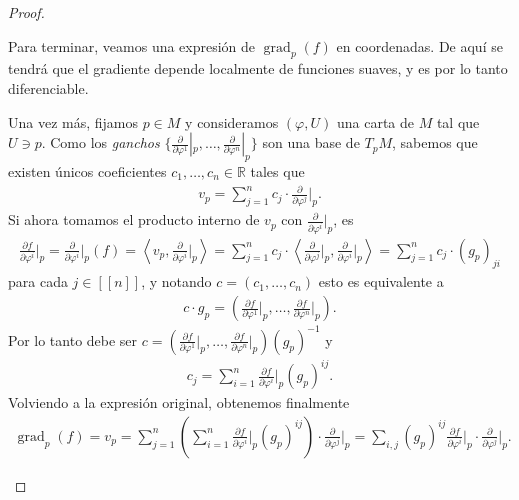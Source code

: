 \documentclass[11pt]{article}
\newcommand{\R}{\mathbb{R}}
\newcommand{\grad}{\operatorname{grad}}
\newcommand{\nat}[1]{[\![#1]\!]}
\newcommand{\ip}[1]{\langle #1 \rangle}
\newcommand{\gancho}[1]{\frac{\partial}{\partial \varphi^{#1}}}
\begin{document}
\begin{proof}
\begin{itemize}[listparindent = \parindent]
Para terminar, veamos una expresión de $\grad_p(f)$ en coordenadas. De aquí se tendrá que el gradiente depende localmente de funciones suaves, y es por lo tanto diferenciable.

Una vez más, fijamos $p \in M$ y consideramos $(\varphi,U)$ una carta de $M$ tal que $U \ni p$. Como los \textit{ganchos} $\{\gancho{1}|_p,\dots,\gancho{n}|_p\}$ son una base de $T_pM$, sabemos que existen únicos coeficientes $c_1, \dots, c_n \in \R$ tales que
\begin{align*}
v_p = \sum_{j = 1}^n c_j \cdot  \gancho{j}\Big|_p.
\end{align*} 
Si ahora tomamos el producto interno de $v_p$ con $\gancho{i}|_p$, es
\begin{align*}
\frac{\partial f}{\partial \varphi^i}\Big|_p = \gancho{i}\Big|_p(f) = \left\ip{v_p,\gancho{i}\Big|_p\right} = \sum_{j = 1}^n c_j \cdot \left\ip{\gancho{j}\Big|_p,\gancho{i}\Big|_p\right} = \sum_{j = 1}^n c_j \cdot (g_p)_{ji}
\end{align*}
para cada $j \in \nat{n}$, y notando $c = (c_1, \dots, c_n)$ esto es equivalente a 
\begin{align*}
c \cdot g_p = \left(\frac{\partial f}{\partial \varphi^1}\Big|_p, \dots, \frac{\partial f}{\partial \varphi^n}\Big|_p\right).
\end{align*}
Por lo tanto debe ser $c = (\frac{\partial f}{\partial \varphi^1}\big|_p, \dots, \frac{\partial f}{\partial \varphi^n}\big|_p)(g_p)^{-1}$ y
\begin{align*}
c_j = \sum_{i=1}^n \frac{\partial f}{\partial \varphi^i}\Big|_p (g_p)^{ij}.
\end{align*}
Volviendo a la expresión original, obtenemos finalmente
\begin{align*}
\grad_p(f) = v_p = \sum_{j = 1}^n \left(\sum_{i=1}^n \frac{\partial f}{\partial \varphi^i}\Big|_p (g_p)^{ij}\right) \cdot \gancho{j}\Big|_p = \sum_{i,j}(g_p)^{ij} \frac{\partial f}{\partial \varphi^i}\Big|_p \cdot \gancho{j}\Big|_p.
\end{align*}


\end{itemize}
\end{proof}
\end{document}
